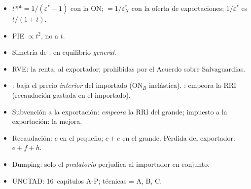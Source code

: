 \documentclass{article}
\begin{document}
\begin{columnas}
\begin{trampa}
\begin{itemize}
\item $t^{\mathrm{opt}}=1/(\varepsilon^*-1)$ con la ON; $=1/\varepsilon^*_X$ con la oferta de exportaciones; $1/\varepsilon^*$ es $t/(1+t)$.
\item PIE $\propto t^2$, no a $t$.
\item Simetría de : en equilibrio \emph{general}.
\item RVE: la renta, al exportador; prohibidas por el Acuerdo sobre Salvaguardias.
\item {}: baja el precio \emph{interior} del importado (ON$_B$ inelástica). : empeora la RRI (recaudación gastada en el importado).
\item Subvención a la exportación: \emph{empeora} la RRI del grande; impuesto a la exportación: la mejora.
\item Recaudación: $c$ en el pequeño; $c+e$ en el grande. Pérdida del exportador: $e+f+h$.
\item Dumping: solo el \emph{predatorio} perjudica al importador en conjunto.
\item UNCTAD: 16~capítulos A-P; técnicas = A, B, C.
\end{itemize}
\end{trampa}

\end{columnas}
\end{document}
